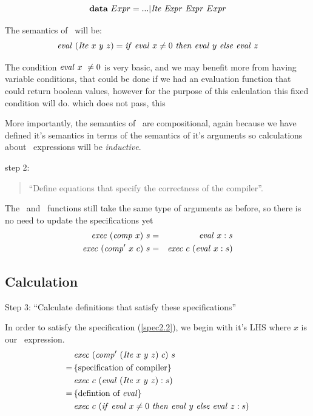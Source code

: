\documentclass {article}
\begin{document}
\[ \textbf{data}\ Expr = ... | \mathit{Ite\ } \mathit{Expr\ } \mathit{Expr\ } Expr \]

\noindent The semantics of \ite\ will be:
\newcommand{\ifff}{\mathit{if\ }}
\newcommand{\tthen}{\mathit{then\ }}
\newcommand{\eelse }{\mathit{else\ }}
\begin{equation}
\evalf (\Ite x\ y\ z) \\
	= \ifff \evalf x \not= 0\ 
		\tthen \evalf y\ \eelse  \evalf z 
			\label{evalite}
\end{equation}

The condition $\mathit{eval\ } x\ \not= 0$ is very basic,
and we may benefit more from having variable conditions,
that could be done if we had an evaluation function 
that could return boolean values, 
however for the purpose of this calculation
this fixed condition will do.
which does not pass, this

More importantly, the semantics of \ite\
are compositional, 
again because we have defined it's
semantics in terms of the semantics of 
it's arguments so
calculations about \ite\ expressions
will be \emph{inductive}.

step 2: 
\begin{quote}
``Define equations that specify the correctness of the compiler''.
\end{quote}
The \exec\ and \comp\ functions still take the same
type of arguments as before,
so there is no need to update the specifications yet
\begin{eqnarray}
\mathit{exec\ }  (\mathit{comp\ }  x)\  s &=& \mathit{eval\ }   x:s \label{spec1.2}\\
\mathit{exec\ }  (\mathit{comp'\ }   x\  c)\ s &=& \mathit{exec\ }  c\  (\mathit{eval\ }  x:s) \label{spec2.2}
\end{eqnarray}

\subsection{Calculation} \label{itecalc}

Step 3: ``Calculate definitions that 
		satisfy these specifications''

In order to satisfy the specification (\ref{spec2.2}),
we begin with it's LHS where $x$ is our
\ite\ expression.
\begin{align*}
	&\Exec (\Compp  (\Ite x\ y\ z)\ c)\ s \\
	=\, & \{ \mbox{specification of compiler} \} \\
	&\Exec c\ (\evalf  (\Ite x\ y\ z) : s) \\
	=\, & \{\mbox{defintion of \eval}\} \\
	&\Exec c\ (\ifff \evalf x \not= 0\ 
		\tthen \evalf y\ \eelse  \evalf z : s)
\end{align*}
\end{document}
